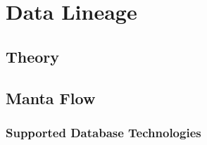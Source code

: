 \chapter{Data Lineage}

\section{Theory}

\section{Manta Flow}

\subsection{Supported Database Technologies}
